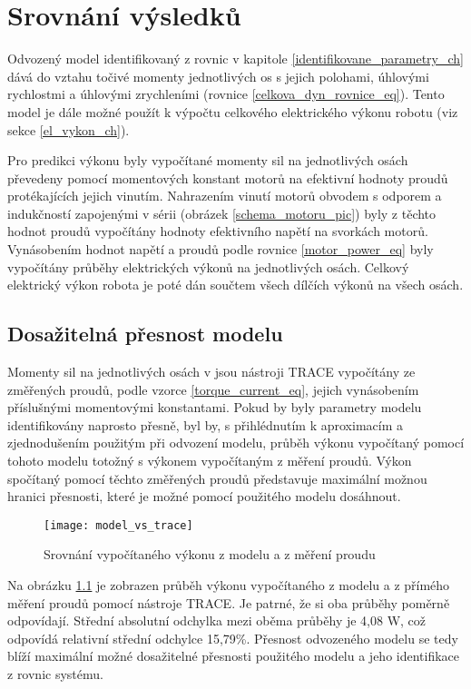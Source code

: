 \chapter{Srovnání výsledků}

Odvozený model identifikovaný z rovnic v kapitole \ref{identifikovane_parametry_ch} dává do vztahu točivé momenty jednotlivých os s jejich polohami, úhlovými rychlostmi a úhlovými zrychleními (rovnice \eqref{celkova_dyn_rovnice_eq}). Tento model je dále možné použít k výpočtu celkového elektrického výkonu robotu (viz sekce \ref{el_vykon_ch}).

Pro predikci výkonu byly vypočítané momenty sil na jednotlivých osách převedeny pomocí momentových konstant motorů na efektivní hodnoty proudů protékajících jejich vinutím. Nahrazením vinutí motorů obvodem s odporem a indukčností zapojenými v sérii (obrázek \ref{schema_motoru_pic}) byly z těchto hodnot proudů vypočítány hodnoty efektivního napětí na svorkách motorů. Vynásobením hodnot napětí a proudů podle rovnice \eqref{motor_power_eq} byly vypočítány průběhy elektrických výkonů na jednotlivých osách. Celkový elektrický výkon robota je poté dán součtem všech dílčích výkonů na všech osách. 

\section{Dosažitelná přesnost modelu}
\label{dosaz_presnost_sec}
Momenty sil na jednotlivých osách v jsou nástroji TRACE vypočítány ze změřených proudů, podle vzorce \eqref{torque_current_eq}, jejich vynásobením příslušnými momentovými konstantami. Pokud by byly parametry modelu identifikovány naprosto přesně, byl by, s přihlédnutím k aproximacím a zjednodušením použitým při odvození modelu, průběh výkonu vypočítaný pomocí tohoto modelu totožný s výkonem vypočítaným z měření proudů. Výkon spočítaný pomocí těchto změřených proudů představuje maximální možnou hranici přesnosti, které je možné pomocí použitého modelu dosáhnout. 

\begin{figure}[h!]
\texttt{[image: model\_vs\_trace]}
\caption{Srovnání vypočítaného výkonu z modelu a z měření proudu}
\label{model_vs_trace_pic}
\end{figure}

Na obrázku \ref{model_vs_trace_pic} je zobrazen průběh výkonu vypočítaného z modelu a z přímého měření proudů pomocí nástroje TRACE. Je patrné, že si oba průběhy poměrně odpovídají. Střední absolutní odchylka mezi oběma průběhy je 4,08 W, což odpovídá relativní střední odchylce 15,79\%. Přesnost odvozeného modelu se tedy blíží maximální možné dosažitelné přesnosti použitého modelu a jeho identifikace z rovnic systému.

